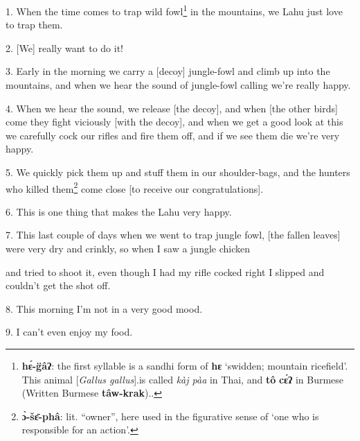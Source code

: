 \setcounter{footnote}{0}

1. When the time comes to trap wild fowl\footnote{\textbf{hɛ́-g̈âʔ}: the first syllable is a sandhi form of \textbf{hɛ} `swidden; mountain ricefield'. This animal [\textit{Gallus gallus}].is called \textit{kàj pàa} in Thai, and \textbf{tô} \textbf{cɛ́ʔ} in Burmese (Written Burmese \textbf{tâw-krak})..} in the mountains, we Lahu just love
to trap them.

2. [We] really want to do it!

3. Early in the morning we carry a [decoy] jungle-fowl and climb up into the mountains,
and when we hear the sound of jungle-fowl calling we're really happy.

4. When we hear the sound, we release [the decoy], and when [the other birds] come
they fight viciously [with the decoy], and when we get a good look at this we carefully
cock our rifles and fire them off, and if we see them die we're very happy.

5. We quickly pick them up and stuff them in our shoulder-bags, and the hunters
who killed them\footnote{\textbf{ɔ̀-šɛ̄-phâ}: lit. ``owner'', here used in the figurative sense of `one who is responsible for an action'.} come close [to receive our congratulations].

6. This is one thing that makes the Lahu very happy.

7. This last couple of days when we went to trap jungle fowl, [the fallen leaves]
were very dry and crinkly, so when I saw a jungle chicken

and tried to shoot it, even though I had my rifle cocked right I slipped and couldn't
get the shot off.

8. This morning I'm not in a very good mood.

9. I can't even enjoy my food.

